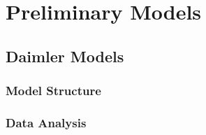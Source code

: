 \section{Preliminary Models}
\subsection{Daimler Models}
\subsubsection*{Model Structure}

\subsubsection*{Data Analysis}
